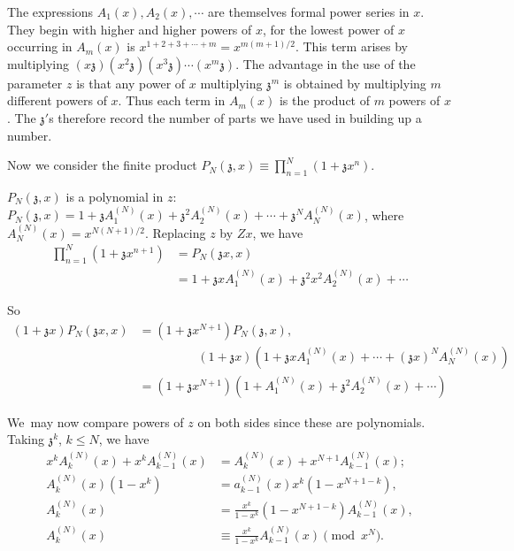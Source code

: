 The expressions $A_1(x),A_2(x), \cdots$ are themselves formal power
series in $x$. They begin with higher and higher powers of $x$, for
the lowest power of $x$ occurring in $A_m(x)$ is $x^{1+2+3+\cdots +m}=
x^{m(m+1)/2}$. This term arises by multiplying
$(x\mathfrak{z})(x^2\mathfrak{z})(x^3\mathfrak{z})\cdots (x^m
\mathfrak{z})$. The advantage in the use of the parameter $z$ is that
any power of $x$ multiplying $\mathfrak{z}^m$ is obtained by
multiplying $m$ different powers of $x$. Thus each term in $A_m (x)$
is the product of $m$ powers of $x$. The $\mathfrak{z}'$s therefore
record the number of parts we have used in building up a number. 

Now we consider the finite product $P_N (\mathfrak{z}, x)  \equiv
\prod\limits_{n=1}^N (1+ \mathfrak{z}x^n)$.

$P_N (\mathfrak{z}, x)$ is a polynomial in $z$: $P_N(\mathfrak{z}, x)=
1+ \mathfrak{z} A_1^{(N)}(x) + \mathfrak{z}^2 A_2^{(N)} (x) + \cdots +
\mathfrak{z}^N A_N^{(N)} (x)$, where $A_N^{(N)} (x) =
x^{N(N+1)/2}$. Replacing $z$ by $Zx$, we have
\begin{align*}
  \prod\limits_{n=1}^N (1+ \mathfrak{z}x^{n+1})& = P_N (\mathfrak{z}x,
  x)\\
  & = 1+ \mathfrak{z}x A_1^{(N)} (x) + \mathfrak{z}^2 x^2 A_2^{(N)}(x)
  + \cdots
\end{align*}

So 
\begin{align*}
  (1+ \mathfrak{z}x) P_N (\mathfrak{z}x, x)& = \left(1+
  \mathfrak{z}x^{N+1}\right) P_N (\mathfrak{z}, x),\\
  & \hspace{2cm} (1+ \mathfrak{z}x)\left(1+\mathfrak{z}x A_1^{(N)} (x)
  + \cdots + (\mathfrak{z} x)^N  A_N^{(N)} (x)\right)\\
  & = \left(1+ \mathfrak{z} x^{N+1}\right) \left(1+ A_1^{(N)} (x) + \mathfrak{z}^2
  A_2^{(N)} (x) + \cdots \right)
\end{align*} 

We\pageoriginale\  may now compare powers of $z$ on both sides since these are
polynomials. Taking $\mathfrak{z}^k$, $k \leq N$, we have 
\begin{align*}
  x^k A_k^{(N)} (x) + x^k A_{k-1}^{(N)} (x) & = A_k ^{(N)} (x) +
  x^{N+1} A_{k-1}^{(N)} (x);\\
  A_k^{(N)} (x) (1-x^k) & = a_{k-1}^{(N)} (x) x^k \left(1-x^{N+1-k}\right),\\
  A_k^{(N)} (x) & = \frac{x^k}{1-x^k} \left(1-x^{N+1-k}\right) A_{k-1}^{(N)}
  (x),\\
  A_k^{(N)} (x) & \equiv \frac{x^k}{1-x^k} A_{k-1}^{(N)} (x) \pmod{x^N}.
\end{align*}

